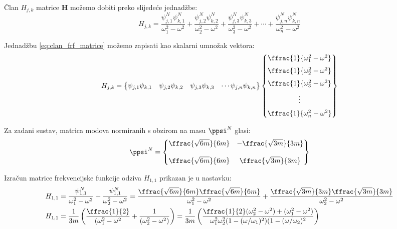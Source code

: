 Član $H_{j,k}$ matrice $\mathbf{H}$ možemo dobiti preko slijedeće jednadžbe:
\begin{equation}\label{eq:clan_frf_matrice}
    H_{j,k}=\frac{\psi^N_{j,1}\psi^N_{k,1}}{\omega_1^2-\omega^2}
            +
            \frac{\psi^N_{j,2}\psi^N_{k,2}}{\omega_2^2-\omega^2}
            +
            \frac{\psi^N_{j,3}\psi^N_{k,3}}{\omega_3^2-\omega^2}
            +
            \cdots
            +
            \frac{\psi^N_{j,n}\psi^N_{k,n}}{\omega_n^2-\omega^2}
\end{equation}

Jednadžbu \eqref{eq:clan_frf_matrice} možemo zapisati kao skalarni umnožak vektora:
\begin{equation}\label{eq:clan_frf_matrica_vektorski}
    H_{j,k}
    =
    \begin{Bmatrix}
        \psi_{j,1}\psi_{k,1} &
        \psi_{j,2}\psi_{k,2} &
        \psi_{j,3}\psi_{k,3} &
        \cdots
        \psi_{j,n}\psi_{k,n}
    \end{Bmatrix}
    \begin{Bmatrix}
        \ffrac{1}{\omega_1^2-\omega^2}\\[6pt]
        \ffrac{1}{\omega_2^2-\omega^2}\\[6pt]
        \ffrac{1}{\omega_3^2-\omega^2}\\[6pt]
        \vdots\\[6pt]
        \ffrac{1}{\omega_n^2-\omega^2}
    \end{Bmatrix}
\end{equation}

Za zadani sustav, matrica modova normiranih s obzirom na masu $\ppsi^N$ glasi:
\[
    \ppsi^N
    =
    \begin{Bmatrix}
        \ffrac{\sqrt{6m}}{6m} & -\ffrac{\sqrt{3m}}{3m}\\[12pt]
        \ffrac{\sqrt{6m}}{6m} & \ffrac{\sqrt{3m}}{3m}
    \end{Bmatrix}
\]

Izračun matrice frekvencijske funkcije odziva $H_{1,1}$ prikazan je u nastavku:
\[
\begin{aligned}
    H_{1,1} &=
    \frac{\psi^N_{1,1}}{\omega_1^2-\omega^2}+\frac{\psi^N_{1,1}}{\omega_2^2-\omega^2}
    =
    \frac{\ffrac{\sqrt{6m}}{6m}\ffrac{\sqrt{6m}}{6m}}{\omega_1^2-\omega^2}
    +
    \frac{\ffrac{\sqrt{3m}}{3m}\ffrac{\sqrt{3m}}{3m}}{\omega_2^2-\omega^2}\\
    H_{1,1} &=
    \frac{1}{3m} 
        \left(
            \frac{\ffrac{1}{2}}{(\omega_1^2-\omega^2}
            +
            \frac{1}{(\omega_2^2-\omega^2)}
        \right)
    =
    \frac{1}{3m}
        \left(
            \frac{\ffrac{1}{2}(\omega_2^2-\omega^2)+(\omega_1^2-\omega^2)}
                {\omega_1^2\omega_2^2(1-(\omega/\omega_1)^2)(1-(\omega/\omega_2)^2}
        \right)\\
\end{aligned}
\]

